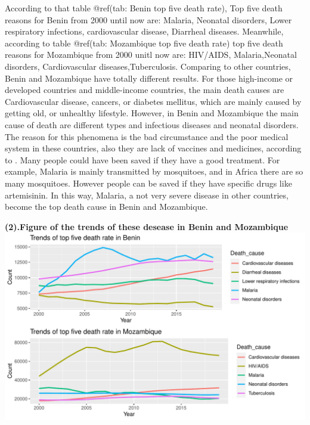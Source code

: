 \documentclass[11pt,a4paper,]{article}
\begin{document}
According to that table @ref(tab: Benin top five death rate), Top five death reasons for Benin from 2000 until now are: Malaria, Neonatal disorders, Lower respiratory infections, cardiovascular disease, Diarrheal diseases.
Meanwhile, according to table @ref(tab: Mozambique top five death rate) top five death reasons for Mozambique from 2000 unitl now are: HIV/AIDS, Malaria,Neonatal disorders, Cardiovascular diseases,Tuberculosis.
Comparing to other countries, Benin and Mozambique have totally different results. For those high-income or developed countries and middle-income countries, the main death causes are Cardiovascular disease, cancers, or diabetes mellitus, which are mainly caused by getting old, or unhealthy lifestyle. However, in Benin and Mozambique the main cause of death are different types and infectious diseases and neonatal disorders. The reason for this phenomena is the bad circumstance and the poor medical system in these countries, also they are lack of vaccines and medicines, according to \textcite{mbaye2019telling}. Many people could have been saved if they have a good treatment. For example, Malaria is mainly transmitted by mosquitoes, and in Africa there are so many mosquitoes. However people can be saved if they have specific drugs like artemisinin. In this way, Malaria, a not very severe disease in other countries, become the top death cause in Benin and Mozambique.

\textbf{(2).Figure of the trends of these desease in Benin and Mozambique}
\includegraphics{Assignment4_files/figure-latex/topfiveplot-1.pdf}
\end{document}
